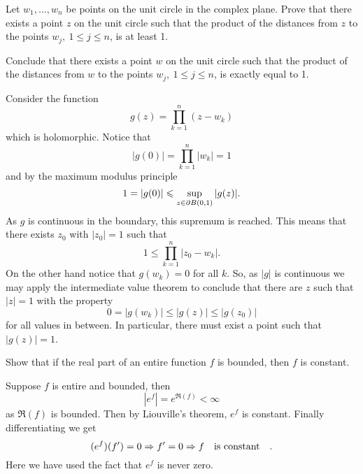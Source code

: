 \documentclass[12pt]{memoir}
\begin{document}
\begin{Ej}
    Let $w_1,\dots , w_n$ be points on the unit circle in the complex plane. Prove that there exists a point $z$ on the unit circle such that the product of the distances from $z$ to the points $w_j,\ 1\leq j\leq n$, is at least 1.\par
    Conclude that there exists a point $w$ on the unit circle such that the product of the distances from $w$ to the points $w_j,\ 1\leq j\leq n$, is exactly equal to 1.
\end{Ej}
\begin{ptcbr}
Consider the function 
$$g(z)=\prod_{k=1}^{n}(z-w_k)$$
which is holomorphic. Notice that 
$$|g(0)|=\prod_{k=1}^{n}|w_k|=1$$
and by the maximum modulus principle 
$$1=|g(0)|\leqslant\sup_{z\in\partial B(0,1)}|g(z)|.$$
As $g$ is continuous in the boundary, this supremum is reached. This means that there exists $z_0$ with $|z_0|=1$ such that 
$$1\leq \prod_{k=1}^{n}|z_0-w_k|.$$
On the other hand notice that $g(w_k)=0$ for all $k$. So, as $|g|$ is continuous we may apply the intermediate value theorem to conclude that there are $z$ such that $|z|=1$ with the property 
$$0=|g(w_k)|\leq |g(z)|\leq |g(z_0)|$$
for all values in between. In particular, there must exist a point such that $|g(z)|=1$.
\end{ptcbr}
\newpage
\begin{Ej}
    Show that if the real part of an entire function $f$ is bounded, then $f$ is constant. 
\end{Ej}

\begin{ptcbr}
Suppose $f$ is entire and bounded, then 
$$|e^f|=e^{\Re(f)}<\infty$$
as $\Re(f)$ is bounded. Then by Liouville's theorem, $e^f$ is constant. Finally differentiating we get 
$$(e^f)(f')=0\Rightarrow f'=0\Rightarrow f\quad\text{is constant}\quad.$$
Here we have used the fact that $e^f$ is never zero.
\end{ptcbr}
\end{document}

